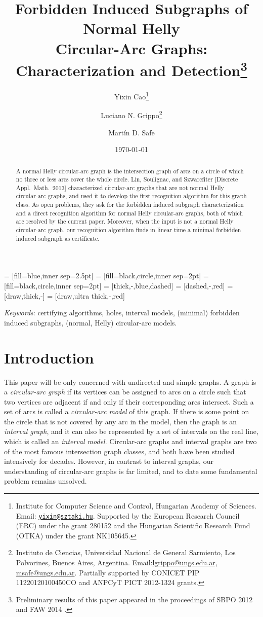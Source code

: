 \documentclass[10pt]{article}
\title{Forbidden Induced Subgraphs of Normal Helly \\Circular-Arc
  Graphs: Characterization and Detection\thanks{Preliminary results of
    this paper appeared in the proceedings of SBPO 2012
    \cite{grippo-12-cag-without-dominating-triple} and FAW 2014
    \cite{cao-14-recognizing-nhcag}.}}
\author{Yixin Cao\thanks{Institute for Computer Science and Control,
    Hungarian Academy of Sciences.  Email:
    \href{mailto:yixin@sztaki.hu}{\tt yixin@sztaki.hu}.  Supported by
    the European Research Council (ERC) under the grant 280152 and the
    Hungarian Scientific Research Fund (OTKA) under the grant
    NK105645. }  \and Luciano N. Grippo\thanks{Instituto de Ciencias,
    Universidad Nacional de General Sarmiento, Los Polvorines, Buenos
    Aires, Argentina.
    Email:\href{mailto:lgrippo@ungs.edu.ar}{lgrippo@ungs.edu.ar},
    \href{mailto:msafe@ungs.edu.ar}{msafe@ungs.edu.ar}.  Partially
    supported by CONICET PIP 11220120100450CO and ANPCyT PICT
    2012-1324 grants.}
  \addtocounter{footnote}{-1}
  \and Mart\'in D. Safe\footnotemark
 }
\date{\today}
\newcommand{\keywords}[1]{\bigskip \par\noindent
{\small{\em Keywords\/}: #1}}
\begin{document}
\maketitle
{}  = [fill=blue,inner sep=2.5pt]
 = [fill=black,circle,inner sep=2pt]
  = [fill=black,circle,inner sep=2pt]
 = [thick,-,blue,dashed]
 = [dashed,-,red]
    = [draw,thick,-]
 = [draw,ultra thick,-,red]

\begin{abstract}
  A normal Helly circular-arc graph is the intersection graph of arcs
  on a circle of which no three or less arcs cover the whole circle.
  Lin, Soulignac, and Szwarcfiter [Discrete Appl.\ Math.\ 2013]
  characterized circular-arc graphs that are not normal Helly
  circular-arc graphs, and used it to develop the first recognition
  algorithm for this graph class.  As open problems, they ask for the
  forbidden induced subgraph characterization and a direct recognition
  algorithm for normal Helly circular-arc graphs, both of which are
  resolved by the current paper.  Moreover, when the input is not a
  normal Helly circular-arc graph, our recognition algorithm finds in
  linear time a minimal forbidden induced subgraph as certificate.
 \end{abstract}
 \keywords{certifying algorithms, holes, interval models, (minimal)
   forbidden induced subgraphs, (normal, Helly) circular-arc models.}

\section{Introduction} 
This paper will be only concerned with undirected and simple graphs.
A graph is a \emph{circular-arc graph} if its vertices can be assigned
to arcs on a circle such that two vertices are adjacent if and only if
their corresponding arcs intersect.  Such a set of arcs is called a
\emph{circular-arc model} of this graph.  If there is some point on
the circle that is not covered by any arc in the model, then the graph
is an \emph{interval graph}, and it can also be represented by a set
of intervals on the real line, which is called an \emph{interval
  model}.  Circular-arc graphs and interval graphs are two of the most
famous intersection graph classes, and both have been studied
intensively for decades.  However, in contrast to interval graphs, our
understanding of circular-arc graphs is far limited, and to date some
fundamental problem remains unsolved.
\end{document}
